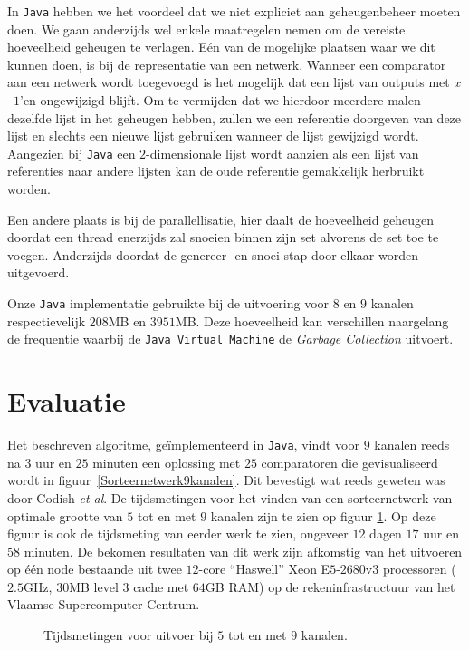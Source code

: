 \documentclass{article}
\begin{document}
In \texttt{Java} hebben we het voordeel dat we niet expliciet aan geheugenbeheer moeten doen.
We gaan anderzijds wel enkele maatregelen nemen om de vereiste hoeveelheid geheugen te verlagen.
E\'en van de mogelijke plaatsen waar we dit kunnen doen, is bij de representatie van een netwerk.
Wanneer een comparator aan een netwerk wordt toegevoegd is het mogelijk dat een lijst van outputs met $x$~$1$'en ongewijzigd blijft.
Om te vermijden dat we hierdoor meerdere malen dezelfde lijst in het geheugen hebben, zullen we een referentie doorgeven van deze lijst en slechts een nieuwe lijst gebruiken wanneer de lijst gewijzigd wordt.
Aangezien bij \texttt{Java} een $2$-dimensionale lijst wordt aanzien als een lijst van referenties naar andere lijsten kan de oude referentie gemakkelijk herbruikt worden. 

Een andere plaats is bij de parallellisatie, hier daalt de hoeveelheid geheugen doordat een thread enerzijds zal snoeien binnen zijn set alvorens de set toe te voegen.
Anderzijds doordat de genereer- en snoei-stap door elkaar worden uitgevoerd.

Onze \texttt{Java} implementatie gebruikte bij de uitvoering voor $8$ en $9$ kanalen respectievelijk $208$MB en $3951$MB.
Deze hoeveelheid kan verschillen naargelang de frequentie waarbij de \texttt{Java Virtual Machine} de \textit{Garbage Collection} uitvoert.

\section{Evaluatie}
Het beschreven algoritme, ge\"implementeerd in \texttt{Java}, vindt voor $9$ kanalen reeds na $3$ uur en $25$ minuten een oplossing met $25$ comparatoren die gevisualiseerd wordt in figuur~\ref{Sorteernetwerk9kanalen}.
Dit bevestigt wat reeds geweten was door Codish \textit{et al}.
De tijdsmetingen voor het vinden van een sorteernetwerk van optimale grootte van $5$ tot en met $9$ kanalen zijn te zien op figuur \ref{Tijdsresultaten}.
Op deze figuur is ook de tijdsmeting van eerder werk te zien, ongeveer $12$ dagen $17$ uur en $58$ minuten\cite{sortingNetworksSize2014}.
De bekomen resultaten van dit werk zijn afkomstig van het uitvoeren op \'e\'en node bestaande uit twee $12$-core ``Haswell'' Xeon E$5$-$2680$v$3$ processoren ($2.5$GHz, $30$MB level $3$ cache met $64$GB RAM) op de rekeninfrastructuur van het Vlaamse Supercomputer Centrum.
\begin{figure}[!h]
\centering
{}
\caption{Tijdsmetingen voor uitvoer bij $5$ tot en met $9$ kanalen.}
\label{Tijdsresultaten}
\end{figure}
\end{document}
